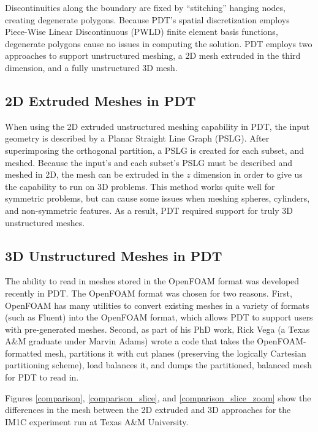 \documentclass[11pt, letterpaper,titlepage,oneside]{article}
\begin{document}
Discontinuities along the boundary are fixed by ``stitching'' hanging nodes, creating degenerate polygons. Because PDT's spatial discretization employs Piece-Wise Linear Discontinuous (PWLD) finite element basis functions, degenerate polygons cause no issues in computing the solution. PDT employs two approaches to support unstructured meshing, a 2D mesh extruded in the third dimension, and a fully unstructured 3D mesh.

\subsection{2D Extruded Meshes in PDT}

When using the 2D extruded unstructured meshing capability in PDT, the input geometry is described by a Planar Straight Line Graph (PSLG). After superimposing the orthogonal partition, a PSLG is created for each subset, and meshed.  Because the input's and each subset's PSLG must be described and meshed in 2D, the mesh can be extruded in the $z$ dimension in order to give us the capability to run on 3D problems. This method works quite well for symmetric problems, but can cause some issues when meshing spheres, cylinders, and non-symmetric features. As a result, PDT required support for truly 3D unstructured meshes.

\subsection{3D Unstructured Meshes in PDT}

The ability to read in meshes stored in the OpenFOAM format was developed recently in PDT. The OpenFOAM format was chosen for two reasons. First, OpenFOAM has many utilities to convert existing meshes in a variety of formats (such as Fluent) into the OpenFOAM format, which allows PDT to support users with pre-generated meshes. Second, as part of his PhD work, Rick Vega (a Texas A\&M graduate under Marvin Adams) wrote a code that takes the OpenFOAM-formatted mesh, partitions it with cut planes (preserving the logically Cartesian partitioning scheme), load balances it, and dumps the partitioned, balanced mesh for PDT to read in. 

Figures \ref{comparison}, \ref{comparison_slice}, and \ref{comparison_slice_zoom} show the differences in the mesh between the 2D extruded and 3D approaches for the IM1C experiment run at Texas A\&M University.
\end{document}

